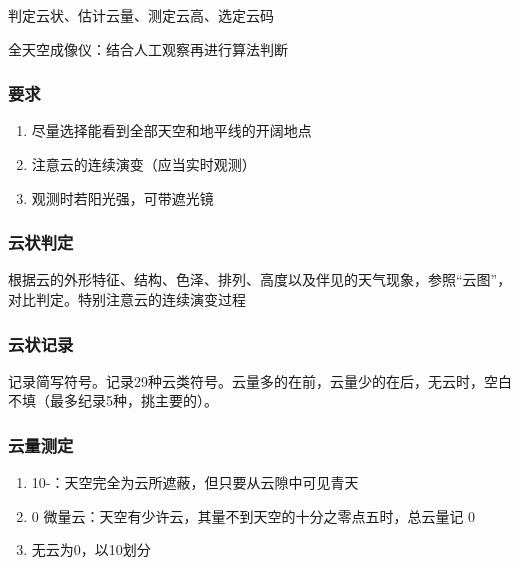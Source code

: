 ﻿\documentclass[UTF8,11pt]{ctexbook}%
\begin{document}
判定云状、估计云量、测定云高、选定云码

全天空成像仪：结合人工观察再进行算法判断

\subsubsection{要求}

\begin{enumerate}
	\item 尽量选择能看到全部天空和地平线的开阔地点
	\item 注意云的连续演变（应当实时观测）
	\item 观测时若阳光强，可带遮光镜
\end{enumerate}

\subsubsection{云状判定}

根据云的外形特征、结构、色泽、排列、高度以及伴见的天气现象，参照“云图”，对比判定。特别注意云的连续演变过程

\subsubsection{云状记录}

记录简写符号。记录29种云类符号。云量多的在前，云量少的在后，无云时，空白不填（最多纪录5种，挑主要的）。

\subsubsection{云量测定}

\begin{enumerate}
	\item 10-：天空完全为云所遮蔽，但只要从云隙中可见青天
	\item 0 微量云：天空有少许云，其量不到天空的十分之零点五时，总云量记 0
	\item 无云为0，以10划分
\end{enumerate}
\end{document}
